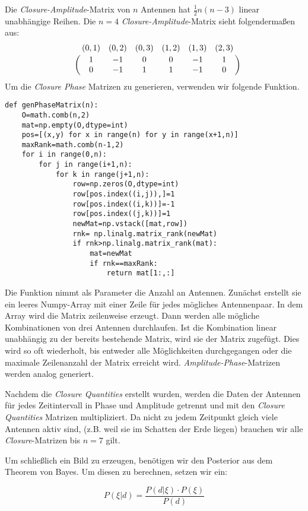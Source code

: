 Die \emph{Closure-Amplitude}-Matrix von $n$ Antennen hat $\frac{1}{2}n(n-3)$ linear unabhängige Reihen. Die $n=4$ \emph{Closure-Amplitude}-Matrix sieht folgendermaßen aus:
\begin{equation}
\bordermatrix{
~ &(0,1)&(0,2)&(0,3)&(1,2)&(1,3)&(2,3)\cr
~&1&-1&0&0&-1&1 \cr
~&0&-1&1&1&-1&0 \cr
}
\end{equation}
Um die \emph{Closure Phase} Matrizen zu generieren, verwenden wir folgende Funktion. 
\begin{verbatim}
def genPhaseMatrix(n):
    O=math.comb(n,2)
    mat=np.empty(O,dtype=int)
    pos=[(x,y) for x in range(n) for y in range(x+1,n)]
    maxRank=math.comb(n-1,2)
    for i in range(0,n):
        for j in range(i+1,n):
            for k in range(j+1,n):
                row=np.zeros(O,dtype=int)
                row[pos.index((i,j)),]=1
                row[pos.index((i,k))]=-1
                row[pos.index((j,k))]=1
                newMat=np.vstack([mat,row])
                rnk= np.linalg.matrix_rank(newMat)
                if rnk>np.linalg.matrix_rank(mat):
                    mat=newMat
                    if rnk==maxRank:
                        return mat[1:,:]
\end{verbatim}
Die Funktion nimmt als Parameter die Anzahl an Antennen. Zunächst erstellt sie ein leeres Numpy-Array mit einer Zeile für jedes mögliches Antennenpaar. In dem Array wird die Matrix zeilenweise erzeugt. Dann werden alle mögliche Kombinationen von drei Antennen durchlaufen. Ist die Kombination linear unabhängig zu der bereits bestehende Matrix, wird sie der Matrix zugefügt. Dies wird so oft wiederholt, bis entweder alle Möglichkeiten durchgegangen oder die maximale Zeilenanzahl der Matrix erreicht wird. \emph{Amplitude-Phase}-Matrizen werden analog generiert.

Nachdem die \emph{Closure Quantities} erstellt wurden, werden die Daten der Antennen für jedes Zeitintervall in Phase und Amplitude getrennt und mit den \emph{Closure Quantities} Matrizen multipliziert. Da nicht zu jedem Zeitpunkt gleich viele Antennen aktiv sind, (z.B. weil sie im Schatten der Erde liegen) brauchen wir alle \emph{Closure}-Matrizen bis $n=7$ gilt.

Um schließlich ein Bild zu erzeugen, benötigen wir den Posterior aus dem Theorem von Bayes. Um diesen zu berechnen, setzen wir ein: 


\begin{equation}
P(\xi|d)= \frac {P(d|\xi)\cdot P(\xi)}{ P(d) }
\end{equation}


